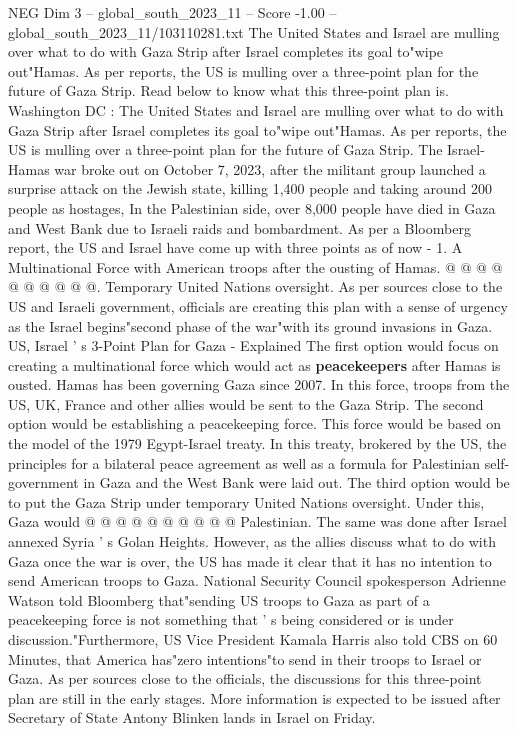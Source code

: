 \begin{textsample}{NEG Dim 3 – global\_south\_2023\_11 – Score -1.00 – global\_south\_2023\_11/103110281.txt}  \label{ex:f3_neg_101}
The United States and Israel are mulling over what to do with Gaza Strip after Israel completes its goal to"wipe out"Hamas.
As per reports, the US is mulling over a three-point plan for the future of Gaza Strip.
Read below to know what this three-point plan is.
Washington DC : The United States and Israel are mulling over what to do with Gaza Strip after Israel completes its goal to"wipe out"Hamas.
As per reports, the US is mulling over a three-point plan for the future of Gaza Strip.
The Israel-Hamas war broke out on October 7, 2023, after the militant group launched a surprise attack on the Jewish state, killing 1,400 people and taking around 200 people as hostages, In the Palestinian side, over 8,000 people have died in Gaza and West Bank due to Israeli raids and bombardment.
As per a Bloomberg report, the US and Israel have come up with three points as of now - 1.
A Multinational Force with American troops after the ousting of Hamas. @ @ @ @ @ @ @ @ @ @.
Temporary United Nations oversight.
As per sources close to the US and Israeli government, officials are creating this plan with a sense of urgency as the Israel begins"second phase of the war"with its ground invasions in Gaza.
US, Israel ' s 3-Point Plan for Gaza - Explained The first option would focus on creating a multinational force which would act as \textbf{peacekeepers} after Hamas is ousted.
Hamas has been governing Gaza since 2007.
In this force, troops from the US, UK, France and other allies would be sent to the Gaza Strip.
The second option would be establishing a peacekeeping force.
This force would be based on the model of the 1979 Egypt-Israel treaty.
In this treaty, brokered by the US, the principles for a bilateral peace agreement as well as a formula for Palestinian self-government in Gaza and the West Bank were laid out.
The third option would be to put the Gaza Strip under temporary United Nations oversight.
Under this, Gaza would @ @ @ @ @ @ @ @ @ @ Palestinian.
The same was done after Israel annexed Syria ' s Golan Heights.
However, as the allies discuss what to do with Gaza once the war is over, the US has made it clear that it has no intention to send American troops to Gaza.
National Security Council spokesperson Adrienne Watson told Bloomberg that"sending US troops to Gaza as part of a peacekeeping force is not something that ' s being considered or is under discussion."Furthermore, US Vice President Kamala Harris also told CBS on 60 Minutes, that America has"zero intentions"to send in their troops to Israel or Gaza.
As per sources close to the officials, the discussions for this three-point plan are still in the early stages.
More information is expected to be issued after Secretary of State Antony Blinken lands in Israel on Friday.

\end{textsample}
